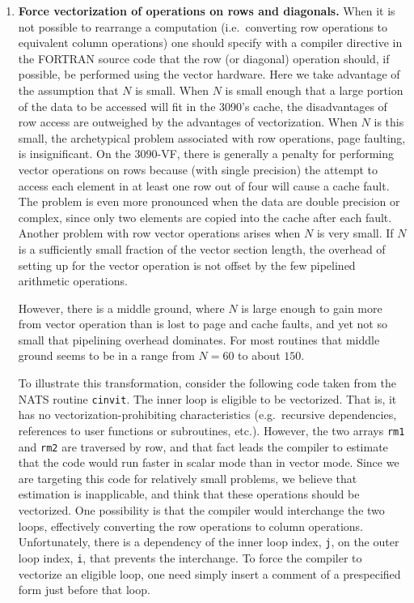 \begin{enumerate}
 \item {\bf Force vectorization of operations on rows and diagonals.}
 When it is not possible to rearrange a computation (i.e.\ converting row
 operations to equivalent column operations) one should specify with a
 compiler directive in the FORTRAN source code that the row (or diagonal)
 operation should, if possible, be performed using the vector hardware.
 Here we take advantage of the assumption that $N$ is small.  When $N$
 is small enough that a large portion of the data to be accessed will
 fit in the 3090's cache, the disadvantages of row access are
 outweighed by the advantages of vectorization.  When $N$ is this small,
 the archetypical problem associated with row operations, page
 faulting, is insignificant.  On the 3090-VF, there is generally a
 penalty for performing vector operations on rows because (with single
 precision) the attempt to access each element in at least one row out
 of four will cause a cache fault.  The problem is even more pronounced
 when the data are double precision or complex, since only two elements
 are copied into the cache after each fault.  Another problem with row
 vector operations arises when $N$ is very small.  If $N$ is a
 sufficiently small fraction of the vector section length, the overhead
 of setting up for the vector operation is not offset by the few
 pipelined arithmetic operations.

 However, there is a middle ground, where $N$ is large enough to gain more
 from vector operation than is lost to page and cache faults, and yet not
 so small that pipelining overhead dominates.  For most routines that middle
 ground seems to be in a range from $N = 60$ to about $150$.

 To illustrate this transformation, consider the following code taken from
 the NATS routine {\tt cinvit}.  The inner loop is eligible to be vectorized.
 That is, it has no vectorization-prohibiting characteristics (e.g.\ recursive
 dependencies, references to user functions or subroutines, etc.).
 However, the two arrays {\tt rm1} and {\tt rm2} are traversed by row, and
 that fact leads the compiler to estimate that the code would run faster in
 scalar mode than in vector mode.  Since we are targeting this code for
 relatively small problems, we believe that estimation is inapplicable, and
 think that these operations should be vectorized.
 One possibility is that the compiler would interchange the two loops,
 effectively converting the row operations to column operations.
 Unfortunately, there is a dependency of the inner loop index, {\tt j}, on
 the outer loop index, {\tt i}, that prevents the interchange.
 To force the compiler to vectorize an eligible loop, one need simply insert
 a comment of a prespecified form just before that loop.


\end{enumerate}
